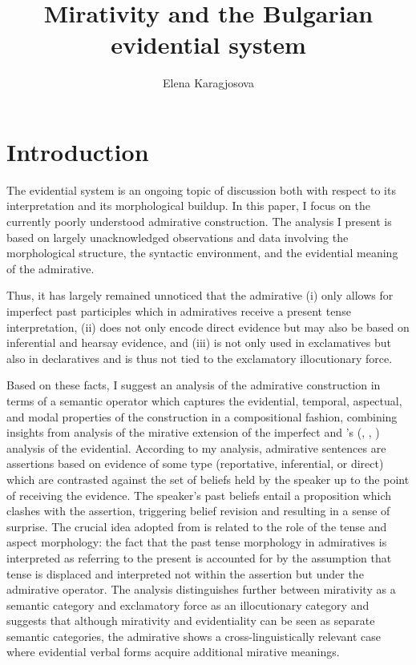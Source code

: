 \documentclass[output=paper]{langscibook}
\author{Elena Karagjosova\affiliation{Freie Universität Berlin}}
\title{Mirativity and the Bulgarian evidential system}
\begin{document}
\maketitle

\section{Introduction}\label{sec:intro}

The  evidential system is an ongoing topic of discussion both with respect to its interpretation and its morphological buildup. In this paper, I focus on the currently poorly understood admirative construction. The analysis I present is based on largely unacknowledged observations and data involving the morphological structure, the syntactic environment, and the evidential meaning of the admirative.

Thus, it has largely remained unnoticed that the admirative (i) only allows for imperfect past participles which in admiratives receive a present tense interpretation, (ii) does not only encode direct evidence but may also be based on inferential and hearsay evidence, and (iii) is not only used in exclamatives but also in declaratives and is thus not tied to the exclamatory illocutionary force.

Based on these facts, I suggest an analysis of the admirative construction in terms of a semantic operator which captures the evidential, temporal, aspectual, and modal properties of the construction in a compositional fashion, combining insights from  analysis of the mirative extension of the  imperfect and \citeauthor{Smirnova2011a}'s (\citeyear{Smirnova2011a}, \citeyear{Smirnova2011b}, \citeyear{Smirnova2013}) analysis of the  evidential. According to my analysis, admirative sentences are assertions based on evidence of some type (reportative, inferential, or direct) which are contrasted against the set of beliefs held by the speaker up to the point of receiving the evidence. The speaker's past beliefs entail a proposition which clashes with the assertion, triggering belief revision and resulting in a sense of surprise.
The crucial idea adopted from \citeauthor{Bustamante2013} is related to the role of the tense and aspect morphology: the fact that the past tense morphology in admiratives is interpreted as referring to the present is accounted for by the assumption that tense is displaced and interpreted not within the assertion but under the admirative operator.
The analysis distinguishes further between mirativity as a semantic category and exclamatory force as an illocutionary category and suggests that although mirativity and evidentiality can be seen as separate semantic categories, the  admirative shows a cross-linguistically relevant case where evidential verbal forms acquire additional mirative meanings.
\end{document}
